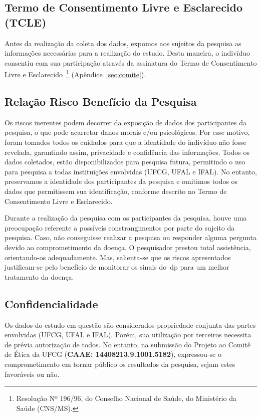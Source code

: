 \subsection{Termo de Consentimento Livre e Esclarecido (TCLE)}
Antes da realização da coleta dos dados, expomos aos sujeitos da pesquisa as informações necessárias para a realização do estudo. Desta maneira, o indivíduo consentiu com sua participação através da assinatura do Termo de Consentimento Livre e Esclarecido~\footnote{Resolução Nº 196/96, do Conselho Nacional de Saúde, do Ministério da Saúde (CNS/MS).} (Apêndice~\ref{sec:comite}). 

\subsection{Relação Risco Benefício da Pesquisa}
Os riscos inerentes podem decorrer da exposição de dados dos participantes da pesquisa, o que pode acarretar danos morais e/ou psicológicos. Por esse motivo, foram tomados todos os cuidados para que a identidade do indivíduo não fosse revelada, garantindo assim, privacidade e confidência das informações. Todos os dados coletados, estão disponibilizados para pesquisa futura, permitindo o uso para pesquisa a todas instituições envolvidas (UFCG, UFAL e IFAL). No entanto, preservamos a identidade dos participantes da pesquisa e omitimos todos os dados que permitissem sua identificação, conforme descrito no Termo de Consentimento Livre e Esclarecido.

Durante a realização da pesquisa com os participantes da pesquisa, houve uma preocupação referente a possíveis constrangimentos por parte do sujeito da pesquisa. Caso, não conseguisse realizar a pesquisa ou responder alguma pergunta devido ao comprometimento da doença. O pesquisador prestou total assistência, orientando-os adequadamente. Mas, salienta-se que os riscos apresentados justificam-se pelo benefício de monitorar os sinais do~\ac{dp} para um melhor tratamento da doença.


\subsection{Confidencialidade}
Os dados do estudo em questão são considerados propriedade conjunta das partes envolvidas (UFCG, UFAL e IFAL). Porém, sua utilização por terceiros necessita de prévia autorização de todos. No entanto, na submissão do Projeto ao Comitê de Ética da UFCG (\textbf{CAAE: 14408213.9.1001.5182}), expressou-se o comprometimento em tornar público os resultados da pesquisa, sejam estes favoráveis ou não.


